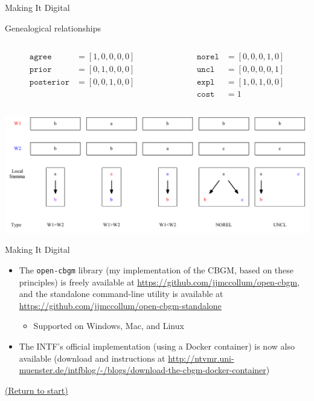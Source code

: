 \documentclass[10pt]{beamer}
\begin{document}
	\begin{frame}{Making It Digital}
		\begin{center}
			Genealogical relationships
		\end{center}
		\begin{columns}
			\begin{column}{0.45\textwidth}
				\begin{align*}
					\mathtt{agree} &= [1,0,0,0,0]\\
					\mathtt{prior} &= [0,1,0,0,0]\\
					\mathtt{posterior} &= [0,0,1,0,0]\\
					\phantom{*}
				\end{align*}
			\end{column}
			\begin{column}{0.45\textwidth}
				\begin{align*}
					\mathtt{norel} &= [0,0,0,1,0]\\
					\mathtt{uncl} &= [0,0,0,0,1]\\
					\mathtt{expl} &= [1,0,1,0,0]\\
					\mathtt{cost} &= 1
				\end{align*}
			\end{column}
		\end{columns}
		\begin{center}
			\includegraphics[width=\textwidth]{../graphics/genealogical-relationships.pdf}
		\end{center}
	\end{frame}
	\begin{frame}{Making It Digital}
		\begin{itemize}
			\item The \texttt{open-cbgm} library (my implementation of the CBGM, based on these principles) is freely available at \url{https://github.com/jjmccollum/open-cbgm}, and the standalone command-line utility is available at \url{https://github.com/jjmccollum/open-cbgm-standalone}
			\begin{itemize}
				\item Supported on Windows, Mac, and Linux
			\end{itemize}
			\item The INTF's official implementation (using a Docker container) is now also available (download and instructions at \url{http://ntvmr.uni-muenster.de/intfblog/-/blogs/download-the-cbgm-docker-container})
		\end{itemize}
		\begin{center}
			\hyperlink{slide:crossroad}{(Return to start)}
		\end{center}
	\end{frame}
	\begin{frame}[allowframebreaks]
		\printbibliography
	\end{frame}
\end{document}
